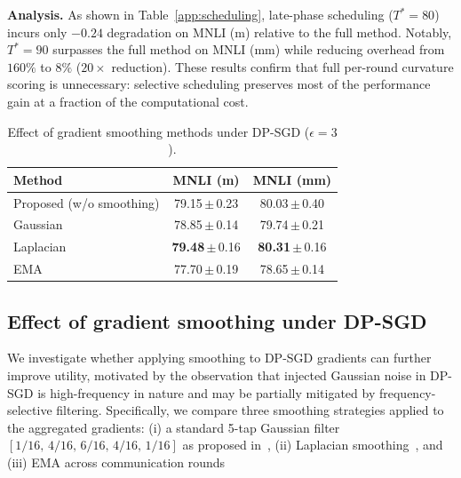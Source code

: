 \textbf{Analysis.}
As shown in Table~\ref{app:scheduling}, late-phase scheduling 
($T^*{=}80$) incurs only $-0.24$ degradation on MNLI (m) 
relative to the full method.
Notably, $T^*{=}90$ surpasses the full method on MNLI (mm) 
while reducing overhead from $160\%$ to $8\%$ ($20\times$ reduction).
These results confirm that full per-round curvature scoring is unnecessary: 
selective scheduling preserves most of the performance gain 
at a fraction of the computational cost.



\begin{table}
\vspace{-13pt}
\centering
\scriptsize
\setlength{\tabcolsep}{2pt}
\renewcommand{\arraystretch}{1.05}
\newcommand{\std}[1]{\,{\tiny$\pm$}\,\tiny #1}

\caption{Effect of gradient smoothing methods under DP-SGD ($\epsilon=3$).}
\label{tab:smoothing}

\begin{tabular}{lcc}
\toprule
\textbf{Method} & \textbf{MNLI (m)} & \textbf{MNLI (mm)} \\
\midrule
Proposed (w/o smoothing)
& 79.15\std{0.23}
& 80.03\std{0.40} \\

Gaussian
& 78.85\std{0.14}
& 79.74\std{0.21} \\

Laplacian
& \textbf{79.48}\std{0.16}
& \textbf{80.31}\std{0.16} \\

EMA
& 77.70\std{0.19}
& 78.65\std{0.14} \\
\bottomrule
\end{tabular}

\vspace{-8pt}
\end{table}

\subsection{Effect of gradient smoothing under DP-SGD}\label{app:kernel}
We investigate whether applying smoothing to DP-SGD gradients can further improve utility, motivated by the observation that injected Gaussian noise in DP-SGD is high-frequency in nature and may be partially mitigated by frequency-selective filtering. Specifically, we compare three smoothing strategies applied to the aggregated gradients: (i) a standard 5-tap Gaussian filter $[1/16,\,4/16,\,6/16,\,4/16,\,1/16]$ as proposed in~\cite{liu2026rethinking}, (ii) Laplacian smoothing~\cite{liang2024differentially}, and (iii) EMA across communication rounds

